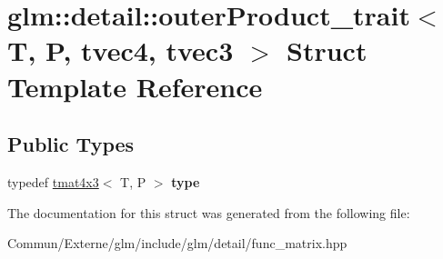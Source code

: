 \hypertarget{structglm_1_1detail_1_1outer_product__trait_3_01_t_00_01_p_00_01tvec4_00_01tvec3_01_4}{}\section{glm\+:\+:detail\+:\+:outer\+Product\+\_\+trait$<$ T, P, tvec4, tvec3 $>$ Struct Template Reference}
\label{structglm_1_1detail_1_1outer_product__trait_3_01_t_00_01_p_00_01tvec4_00_01tvec3_01_4}
\subsection*{Public Types}
\begin{DoxyCompactItemize}
\item 
typedef \hyperlink{structglm_1_1detail_1_1tmat4x3}{tmat4x3}$<$ T, P $>$ {\bfseries type}\hypertarget{structglm_1_1detail_1_1outer_product__trait_3_01_t_00_01_p_00_01tvec4_00_01tvec3_01_4_ac754af38f5684e757b9fcc70ecaea5c8}{}\label{structglm_1_1detail_1_1outer_product__trait_3_01_t_00_01_p_00_01tvec4_00_01tvec3_01_4_ac754af38f5684e757b9fcc70ecaea5c8}

\end{DoxyCompactItemize}


The documentation for this struct was generated from the following file\+:\begin{DoxyCompactItemize}
\item 
Commun/\+Externe/glm/include/glm/detail/func\+\_\+matrix.\+hpp\end{DoxyCompactItemize}

